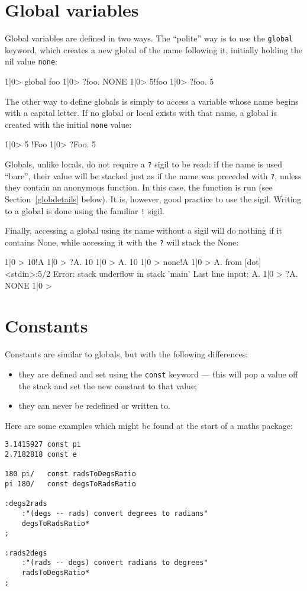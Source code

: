 

\section{Global variables}
Global variables are defined in two ways. The ``polite'' way is to use the 
\texttt{global} keyword, which creates a new global of the name following
it, initially holding the nil value \texttt{none}:
\begin{v}
1|0> global foo
1|0> ?foo.
NONE
1|0> 5!foo
1|0> ?foo.
5
\end{v}
The other way to define globals is simply to access a variable whose
name begins with a capital letter. If no global or local exists with that
name, a global is created with the initial \texttt{none} value:
\begin{v}
1|0> 5 !Foo
1|0> ?Foo.
5
\end{v}
Globals, unlike locals, do not require a \texttt{?} sigil to be read:
if the name is used ``bare'', their value will be stacked just as if the name
was preceded with \texttt{?}, unless they contain
an anonymous function. In this case, the function is run (see
Section~\ref{globdetails} below). It is, however, good practice to use
the sigil. Writing to a global is done using the familiar \texttt{!} sigil.

Finally, accessing a global using its name without a sigil
will do nothing if it contains None,
while accessing it with the \texttt{?} will stack the None:
\begin{v}
1|0 > 10!A
1|0 > ?A.
10
1|0 > A.
10
1|0 > none!A
1|0 > A.
  from [dot] <stdin>:5/2
Error: stack underflow in stack 'main'
Last line input: A.
1|0 > ?A.
NONE
1|0 > 
\end{v}


\section{Constants}
Constants are similar to globals, but with the following differences:
\begin{itemize}
\item they are defined and set using the \texttt{const} keyword ---
this will pop a value off the stack and set the new constant to that value;
\item they can never be redefined or written to.
\end{itemize}
Here are some examples which might be found at the start of a maths
package:
\begin{lstlisting}
3.1415927 const pi
2.7182818 const e

180 pi/   const radsToDegsRatio
pi 180/   const degsToRadsRatio

:degs2rads
    :"(degs -- rads) convert degrees to radians"
    degsToRadsRatio*
;

:rads2degs
    :"(rads -- degs) convert radians to degrees"
    radsToDegsRatio*
;
\end{lstlisting}



